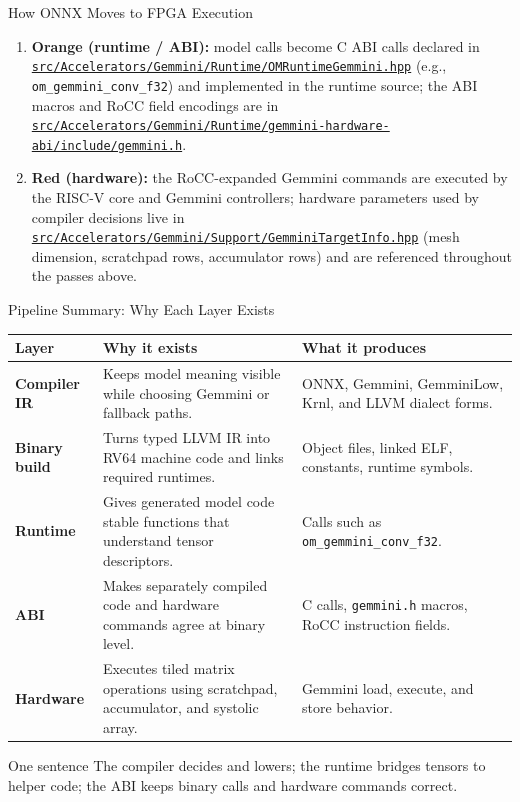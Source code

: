\documentclass[aspectratio=169,10pt]{beamer}
\newcommand{\code}[1]{\texttt{\footnotesize #1}}
\newcommand{\repoRoot}{/home/lahcen/toolchains/onnx-mlir-xcompile/onnx-mlir}
\newcommand{\pathcode}[1]{\href{run:\repoRoot/#1}{\texttt{\scriptsize #1}}}
\newcommand{\edgeword}[1]{\textcolor{red!75!black}{\textbf{#1}}}
\begin{document}
\begin{frame}{How ONNX Moves to FPGA Execution}
\begin{minipage}{0.94\textwidth}
{\begin{enumerate}
      \item \textbf{Orange (runtime / ABI):} model calls become C ABI calls declared in \pathcode{src/Accelerators/Gemmini/Runtime/OMRuntimeGemmini.hpp} (e.g., \code{om_gemmini_conv_f32}) and implemented in the runtime source; the ABI macros and RoCC field encodings are in \pathcode{src/Accelerators/Gemmini/Runtime/gemmini-hardware-abi/include/gemmini.h}.
      \item \textbf{Red (hardware):} the RoCC-expanded Gemmini commands are executed by the RISC-V core and Gemmini controllers; hardware parameters used by compiler decisions live in \pathcode{src/Accelerators/Gemmini/Support/GemminiTargetInfo.hpp} (mesh dimension, scratchpad rows, accumulator rows) and are referenced throughout the passes above.
    \end{enumerate}}
  \end{minipage}
\end{frame}

\begin{frame}{Pipeline Summary: Why Each Layer Exists}
  \scriptsize
  \begin{tabularx}{\textwidth}{@{}lXX@{}}
    \toprule
    Layer & Why it exists & What it produces \\
    \midrule
    \edgeword{Compiler IR} &
      Keeps model meaning visible while choosing Gemmini or fallback paths. &
      ONNX, Gemmini, GemminiLow, Krnl, and LLVM dialect forms. \\
    \edgeword{Binary build} &
      Turns typed LLVM IR into RV64 machine code and links required runtimes. &
      Object files, linked ELF, constants, runtime symbols. \\
    \edgeword{Runtime} &
      Gives generated model code stable functions that understand tensor descriptors. &
      Calls such as \code{om\_gemmini\_conv\_f32}. \\
    \edgeword{ABI} &
      Makes separately compiled code and hardware commands agree at binary level. &
      C calls, \code{gemmini.h} macros, RoCC instruction fields. \\
    \edgeword{Hardware} &
      Executes tiled matrix operations using scratchpad, accumulator, and systolic array. &
      Gemmini load, execute, and store behavior. \\
    \bottomrule
  \end{tabularx}
  \vspace{0.5em}
  \begin{block}{One sentence}
    The compiler decides and lowers; the runtime bridges tensors to helper code; the ABI keeps binary calls and hardware commands correct.
  \end{block}
\end{frame}
\end{document}
